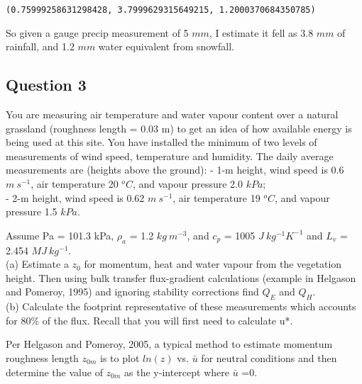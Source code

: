 \documentclass{article}
\begin{document}
    \begin{Verbatim}[commandchars=\\\{\}]
(0.75999258631298428, 3.7999629315649215, 1.2000370684350785)
    \end{Verbatim}

    So given a gauge precip measurement of 5 \(mm\), I estimate it fell as
3.8 \(mm\) of rainfall, and 1.2 \(mm\) water equivalent from snowfall.

    \subsection{Question 3}\label{question-3}

You are measuring air temperature and water vapour content over a
natural grassland (roughness length = 0.03 m) to get an idea of how
available energy is being used at this site. You have installed the
minimum of two levels of measurements of wind speed, temperature and
humidity. The daily average measurements are (heights above the ground):
- 1-m height, wind speed is 0.6 \(m\ s^{-1}\), air temperature 20
\(^oC\), and vapour pressure 2.0 \(kPa\);\\
- 2-m height, wind speed is 0.62 \(m\ s^{-1}\), air temperature 19
\(^oC\), and vapour pressure 1.5 \(kPa\).

Assume Pa = 101.3 kPa, \(\rho_a\) = 1.2 \(kg\ m^{-3}\), and \(c_p\) =
1005 \(J\ kg^{-1} K^{-1}\) and \(L_v\) = 2.454 \(MJ\ kg^{-1}\).\\
(a) Estimate a \(z_0\) for momentum, heat and water vapour from the
vegetation height. Then using bulk transfer flux-gradient calculations
(example in Helgason and Pomeroy, 1995) and ignoring stability
corrections find \(Q_E\) and \(Q_H\).\\
(b) Calculate the footprint representative of these measurements which
accounts for 80\% of the flux. Recall that you will first need to
calculate u*.

Per Helgason and Pomeroy, 2005, a typical method to estimate momentum
roughness length \(z_{0m}\) is to plot \(ln(z)\) vs. \(\bar{u}\) for
neutral conditions and then determine the value of \(z_{0m}\) as the
y-intercept where \(\bar{u}\) =0.
\end{document}
